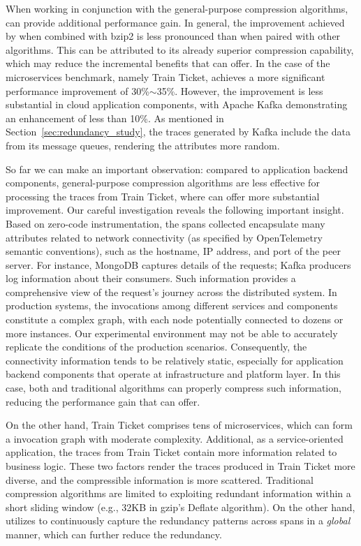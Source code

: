 When working in conjunction with the general-purpose compression algorithms, \alias can provide additional performance gain.
In general, the improvement achieved by \alias when combined with bzip2 is less pronounced than when paired with other algorithms.
This can be attributed to its already superior compression capability, which may reduce the incremental benefits that \alias can offer.
In the case of the microservices benchmark, namely Train Ticket, \alias achieves a more significant performance improvement of 30\%$\sim$35\%.
However, the improvement is less substantial in cloud application components, with Apache Kafka demonstrating an enhancement of less than 10\%.
As mentioned in Section~\ref{sec:redundancy_study}, the traces generated by Kafka include the data from its message queues, rendering the attributes more random.

So far we can make an important observation: compared to application backend components, general-purpose compression algorithms are less effective for processing the traces from Train Ticket, where \alias can offer more substantial improvement.
Our careful investigation reveals the following important insight.
Based on zero-code instrumentation, the spans collected encapsulate many attributes related to network connectivity (as specified by OpenTelemetry semantic conventions), such as the hostname, IP address, and port of the peer server.
For instance, MongoDB captures details of the requests; Kafka producers log information about their consumers.
Such information provides a comprehensive view of the request's journey across the distributed system.
In production systems, the invocations among different services and components constitute a complex graph, with each node potentially connected to dozens or more instances.
Our experimental environment may not be able to accurately replicate the conditions of the production scenarios.
Consequently, the connectivity information tends to be relatively static, especially for application backend components that operate at infrastructure and platform layer.
In this case, both \alias and traditional algorithms can properly compress such information, reducing the performance gain that \alias can offer.

On the other hand, Train Ticket comprises tens of microservices, which can form a invocation graph with moderate complexity.
Additional, as a service-oriented application, the traces from Train Ticket contain more information related to business logic.
These two factors render the traces produced in Train Ticket more diverse, and the compressible information is more scattered.
Traditional compression algorithms are limited to exploiting redundant information within a short sliding window (e.g., 32KB in gzip's Deflate algorithm).
On the other hand, \alias utilizes \sname to continuously capture the redundancy patterns across spans in a \textit{global} manner, which can further reduce the redundancy. 

